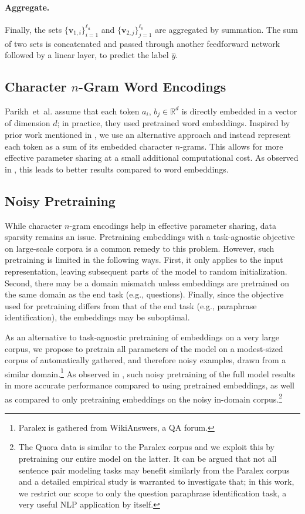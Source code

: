 \documentclass[11pt,letterpaper]{article}
\newcommand{\vb}{\mathbf{v}}
\newcommand{\yhat}{\hat{y}}
\newcommand{\RR}{\mathbb{R}}
\begin{document}
\paragraph{Aggregate.} Finally, the sets $\{\vb_{1,i}\}_{i=1}^{\ell_a}$ and $\{\vb_{2,j}\}_{j=1}^{\ell_b}$ are aggregated by summation. The sum of two sets is concatenated and passed through another feedforward network followed by a linear layer, to predict the label $\yhat$.

\subsection{Character $n$-Gram Word Encodings}
Parikh~et~al.\nocite{parikh.etal.2016} assume that each token $a_i$, $b_j \in \RR^d$ is directly embedded in a vector of dimension $d$; in practice, they used pretrained word embeddings.
Inspired by prior work mentioned in , we use an alternative approach and instead represent each token as a sum of its embedded character $n$-grams. This allows for more effective parameter sharing at a small additional computational cost.  As observed in , this leads to better results compared to word embeddings.

\subsection{Noisy Pretraining}
While character $n$-gram encodings help in effective parameter sharing, data sparsity remains an issue.
Pretraining embeddings with a task-agnostic objective on large-scale corpora \cite{pennington2014glove} is a common remedy to this problem.
However, such pretraining is limited in the following ways. First, it only applies to the input representation, leaving subsequent parts of the model to random initialization. Second, there may be a domain mismatch unless embeddings are pretrained on the same domain as the end task (e.g., questions). Finally, since the objective used for pretraining differs from that of the end task (e.g., paraphrase identification), the embeddings may be suboptimal.

As an alternative to task-agnostic pretraining of embeddings on a very large corpus, we propose to pretrain all parameters of the model on a modest-sized corpus of automatically gathered, and therefore noisy examples, drawn from a similar domain.\footnote{Paralex is gathered from WikiAnswers, a QA forum.}
As observed in , such noisy pretraining of the full model results in more accurate performance compared to using pretrained embeddings, as well as compared to only pretraining embeddings on the noisy in-domain corpus.\footnote{The Quora data is similar to the Paralex corpus and we exploit this by pretraining our entire model on the latter.  It can be argued that not all sentence pair modeling tasks may benefit similarly from the Paralex corpus and a detailed empirical study is warranted to investigate that; in this work, we restrict our scope to only the question paraphrase identification task, a very useful NLP application by itself.}
\end{document}
